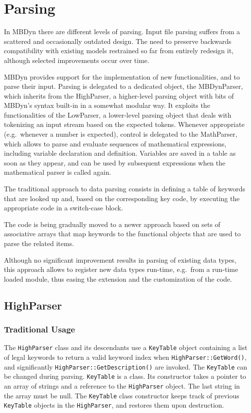 \documentclass[10pt,fleqn,subeqn]{report}
\begin{document}
\chapter{Parsing}
In MBDyn there are different levels of parsing.
Input file parsing suffers from a scattered and occasionally outdated design.
The need to preserve backwards compatibility with existing models
restrained so far from entirely redesign it, although selected improvements
occur over time.

MBDyn provides support for the implementation of new functionalities,
and to parse their input.
Parsing is delegated to a dedicated object, the MBDynParser, which
inherits from the HighParser, a higher-level parsing object 
with bits of MBDyn's syntax built-in in a somewhat modular way.
It exploits the functionalities of the LowParser, a lower-level
parsing object that deals with tokenizing an input stream
based on the expected tokens.
Whenever appropriate (e.g.\ whenever a number is expected),
control is delegated to the MathParser, which allows to parse and evaluate
sequences of mathematical expressions, including variable declaration
and definition.
Variables are saved in a table as soon as they appear, and can be
used by subsequent expressions when the mathematical parser is called again.

The traditional approach to data parsing consists in defining a table
of keywords that are looked up and, based on the corresponding key code,
by executing the appropriate code in a switch-case block.

The code is being gradually moved to a newer approach based on sets
of associative arrays that map keywords to the functional objects
that are used to parse the related items.

Although no significant improvement results in parsing of existing 
data types, this approach allows to register new data types run-time,
e.g.\ from a run-time loaded module, thus easing the extension
and the customization of the code.


\section{HighParser}
\subsection{Traditional Usage}
The \texttt{HighParser} class and its descendants use a \texttt{KeyTable}
object containing a list of legal keywords to return a valid keyword index
when \texttt{HighParser::GetWord()}, and significantly 
\texttt{HighParser::GetDescription()} are invoked.
The \texttt{KeyTable} can be changed during parsing.
\texttt{KeyTable} is a class.
Its constructor takes a pointer to an array of strings and a reference 
to the \texttt{HighParser} object.
The last string in the array must be null.
The \texttt{KeyTable} class constructor keeps track 
of previous \texttt{KeyTable} objects in the \texttt{HighParser}, 
and restores them upon destruction.
\end{document}
